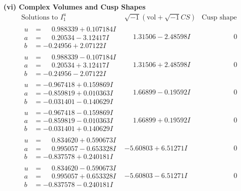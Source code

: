 \documentclass[1p]{elsarticle_modified}
\theoremstyle{definition}
\newcommand{\I}{\sqrt{-1}}
\begin{document}
\newpage\flushleft \textbf{(vi) Complex Volumes and Cusp Shapes}
$$\begin{array}{c|c|c}  
\text{Solutions to }I^u_{1}& \I (\text{vol} + \sqrt{-1}CS) & \text{Cusp shape}\\
 \hline 
\begin{aligned}
u &= \phantom{-}0.988339 + 0.107184 I \\
a &= \phantom{-}0.20534 - 3.12417 I \\
b &= -0.24956 + 2.07122 I\end{aligned}
 & \phantom{-}1.31506 - 2.48598 I & \phantom{-0.000000 } 0 \\ \hline\begin{aligned}
u &= \phantom{-}0.988339 - 0.107184 I \\
a &= \phantom{-}0.20534 + 3.12417 I \\
b &= -0.24956 - 2.07122 I\end{aligned}
 & \phantom{-}1.31506 + 2.48598 I & \phantom{-0.000000 } 0 \\ \hline\begin{aligned}
u &= -0.967418 + 0.159869 I \\
a &= -0.859819 + 0.010363 I \\
b &= -0.031401 - 0.140629 I\end{aligned}
 & \phantom{-}1.66899 - 0.19592 I & \phantom{-0.000000 } 0 \\ \hline\begin{aligned}
u &= -0.967418 - 0.159869 I \\
a &= -0.859819 - 0.010363 I \\
b &= -0.031401 + 0.140629 I\end{aligned}
 & \phantom{-}1.66899 + 0.19592 I & \phantom{-0.000000 } 0 \\ \hline\begin{aligned}
u &= \phantom{-}0.834620 + 0.590673 I \\
a &= \phantom{-}0.995057 - 0.653328 I \\
b &= -0.837578 + 0.240181 I\end{aligned}
 & -5.60803 + 6.51271 I & \phantom{-0.000000 } 0 \\ \hline\begin{aligned}
u &= \phantom{-}0.834620 - 0.590673 I \\
a &= \phantom{-}0.995057 + 0.653328 I \\
b &= -0.837578 - 0.240181 I\end{aligned}
 & -5.60803 - 6.51271 I & \phantom{-0.000000 } 0 \\ \hline\begin{aligned}

\end{aligned}
\end{array}$$
\end{document}
